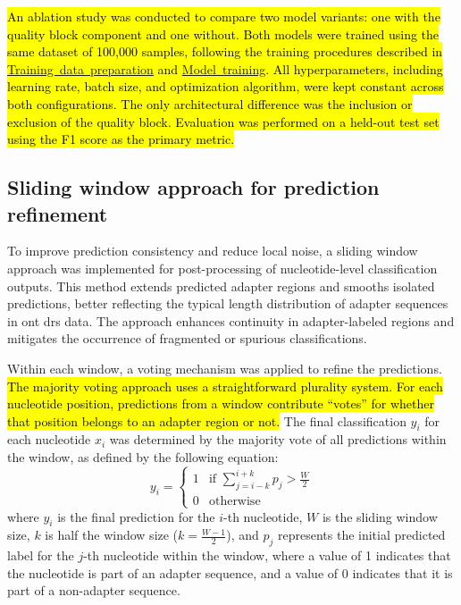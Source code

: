 \documentclass[pdflatex,sn-nature, lineno]{sn-jnl}%
\begin{document}
\hl{An ablation study was conducted to compare two model variants: one with the quality block component and one without. Both models were trained using the same dataset of 100,000 samples, following the training procedures described in \mbox{\hyperref[ssec:data]{Training data preparation}} and \mbox{\hyperref[ssec:training]{Model training}}.
	All hyperparameters, including learning rate, batch size, and optimization algorithm, were kept constant across both configurations. The only architectural difference was the inclusion or exclusion of the quality block.
	Evaluation was performed on a held-out test set using the F1 score as the primary metric.}

\subsection{Sliding window approach for prediction refinement}

To improve prediction consistency and reduce local noise, a sliding window approach was implemented for post-processing of nucleotide-level classification outputs.
This method extends predicted adapter regions and smooths isolated predictions, better reflecting the typical length distribution of adapter sequences in \gls{ont} \gls{drs} data.
The approach enhances continuity in adapter-labeled regions and mitigates the occurrence of fragmented or spurious classifications.

Within each window, a voting mechanism was applied to refine the predictions.
\hl{The majority voting approach uses a straightforward plurality system.
	For each nucleotide position, predictions from a window contribute ``votes'' for whether that position belongs to an adapter region or not.}
The final classification $y_i$ for each nucleotide \( x_i \) was determined by the majority vote of all predictions within the window, as defined by the following equation:
\[
	y_i = \begin{cases}
		1 & \text{if } \sum_{j=i-k}^{i+k} p_j > \frac{W}{2} \\
		0 & \text{otherwise}
	\end{cases}
\]
where \(y_i\) is the final prediction for the $i$-th nucleotide, \( W \) is the sliding window size, \( k \) is half the window size (\( k = \frac{W-1}{2}\)), and  \(p_j\) represents the initial predicted label for the \(j\)-th nucleotide within the window, where a value of 1 indicates that the nucleotide is part of an adapter sequence, and a value of 0 indicates that it is part of a non-adapter sequence.
\end{document}
